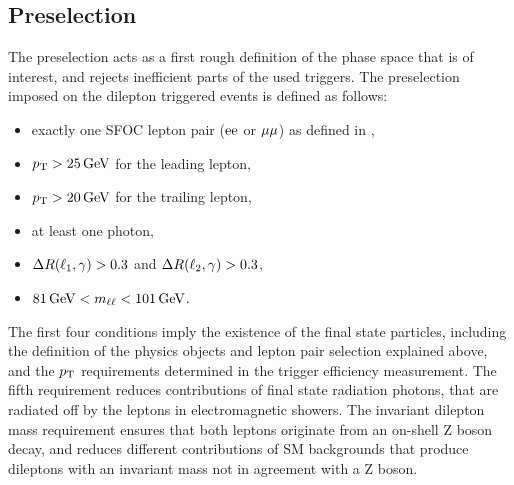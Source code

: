 \subsection{Preselection}
The preselection acts as a first rough definition of the phase space that is of interest, and rejects inefficient parts of the used triggers. The preselection imposed on the dilepton triggered events is defined as follows:
\begin{itemize}
 \item exactly one SFOC lepton pair ($\mathrm{e}\mathrm{e}$ or $\mu\mu$) as defined in ,
 \item $p_{\mathrm{T}}>25\,\text{Ge\hspace{-.08em}V}$ for the leading lepton,
 \item $p_{\mathrm{T}}>20\,\text{Ge\hspace{-.08em}V}$ for the trailing lepton,
 \item at least one photon,
 \item $\Delta R(\ell_1,\gamma)>0.3$ and $\Delta R(\ell_2,\gamma)>0.3$,
 \item $81\,\text{Ge\hspace{-.08em}V}<m_{\ell\ell}<101\,\text{Ge\hspace{-.08em}V}$.
\end{itemize}
The first four conditions imply the existence of the final state particles, including the definition of the physics objects and lepton pair selection explained above, and the $p_{\mathrm{T}}$ requirements determined in the trigger efficiency measurement. The fifth requirement reduces contributions of final state radiation photons, that are radiated off by the leptons in electromagnetic showers. The invariant dilepton mass requirement ensures that both leptons originate from an on-shell Z boson decay, and reduces different contributions of SM backgrounds that produce dileptons with an invariant mass not in agreement with a Z boson.
